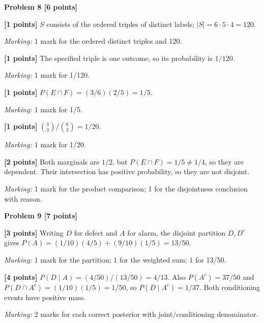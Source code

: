 \documentclass[12pt,letterpaper]{article}
\newcommand{\problemheading}[2][5\baselineskip]{\Needspace{#1}\par\noindent\hspace*{-0.625in}\textbf{#2}\par\nobreak\vspace{0.3em}}
\begin{document}
\vspace{0.65em}
\problemheading[\dimexpr 3\baselineskip+4\baselineskip\relax]{Problem 8 [6 points]}
\begin{description}[font=\normalfont,leftmargin=1.2em,labelsep=0.4em]
\item[(a)] \textbf{[1 points]} $S$ consists of the ordered triples of distinct labels; $|S|=6\cdot5\cdot4=120$.
\par\textit{Marking:} 1 mark for the ordered distinct triples and 120.
\item[(b)] \textbf{[1 points]} The specified triple is one outcome, so its probability is $1/120$.
\par\textit{Marking:} 1 mark for 1/120.
\item[(c)] \textbf{[1 points]} $P(E\cap F)=(3/6)(2/5)=1/5$.
\par\textit{Marking:} 1 mark for 1/5.
\item[(d)] \textbf{[1 points]} $\binom33/\binom63=1/20$.
\par\textit{Marking:} 1 mark for 1/20.
\item[(e)] \textbf{[2 points]} Both marginals are $1/2$, but $P(E\cap F)=1/5\ne1/4$, so they are dependent. Their intersection has positive probability, so they are not disjoint.
\par\textit{Marking:} 1 mark for the product comparison; 1 for the disjointness conclusion with reason.
\end{description}
\vspace{0.65em}
\problemheading[\dimexpr 3\baselineskip+4\baselineskip\relax]{Problem 9 [7 points]}
\begin{description}[font=\normalfont,leftmargin=1.2em,labelsep=0.4em]
\item[(a)] \textbf{[3 points]} Writing $D$ for defect and $A$ for alarm, the disjoint partition $D,D^c$ gives $P(A)=(1/10)(4/5)+(9/10)(1/5)=13/50$.
\par\textit{Marking:} 1 mark for the partition; 1 for the weighted sum; 1 for 13/50.
\item[(b)] \textbf{[4 points]} $P(D\mid A)=(4/50)/(13/50)=4/13$. Also $P(A^c)=37/50$ and $P(D\cap A^c)=(1/10)(1/5)=1/50$, so $P(D\mid A^c)=1/37$. Both conditioning events have positive mass.
\par\textit{Marking:} 2 marks for each correct posterior with joint/conditioning denominator.
\end{description}
\end{document}

